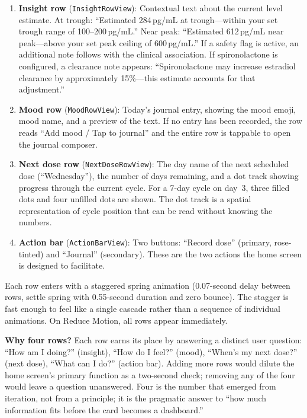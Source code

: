 \documentclass[11pt,a4paper]{article}
\newcommand{\code}[1]{\texttt{\small #1}}
\begin{document}
\begin{enumerate}[nosep,leftmargin=1.4em]
\item \textbf{Insight row} (\code{InsightRowView}): Contextual text about
  the current level estimate. At trough: ``Estimated 284\,pg/mL at
  trough---within your set trough range of 100--200\,pg/mL.'' Near peak:
  ``Estimated 612\,pg/mL near peak---above your set peak ceiling of
  600\,pg/mL.'' If a safety flag is active, an additional note follows
  with the clinical association. If spironolactone is configured, a
  clearance note appears: ``Spironolactone may increase estradiol
  clearance by approximately 15\%---this estimate accounts for that
  adjustment.''

\item \textbf{Mood row} (\code{MoodRowView}): Today's journal entry,
  showing the mood emoji, mood name, and a preview of the text. If no
  entry has been recorded, the row reads ``Add mood / Tap to journal''
  and the entire row is tappable to open the journal composer.

\item \textbf{Next dose row} (\code{NextDoseRowView}): The day name of the
  next scheduled dose (``Wednesday''), the number of days remaining, and
  a dot track showing progress through the current cycle. For a 7-day
  cycle on day~3, three filled dots and four unfilled dots are shown. The
  dot track is a spatial representation of cycle position that can be
  read without knowing the numbers.

\item \textbf{Action bar} (\code{ActionBarView}): Two buttons: ``Record
  dose'' (primary, rose-tinted) and ``Journal'' (secondary). These are
  the two actions the home screen is designed to facilitate.
\end{enumerate}

Each row enters with a staggered spring animation (0.07-second delay
between rows, settle spring with 0.55-second duration and zero bounce).
The stagger is fast enough to feel like a single cascade rather than a
sequence of individual animations. On Reduce Motion, all rows appear
immediately.

\textbf{Why four rows?} Each row earns its place by answering a distinct
user question: ``How am I doing?'' (insight), ``How do I feel?''
(mood), ``When's my next dose?'' (next dose), ``What can I do?''
(action bar). Adding more rows would dilute the home screen's primary
function as a two-second check; removing any of the four would leave a
question unanswered. Four is the number that emerged from iteration, not
from a principle; it is the pragmatic answer to ``how much information
fits before the card becomes a dashboard.''
\end{document}
